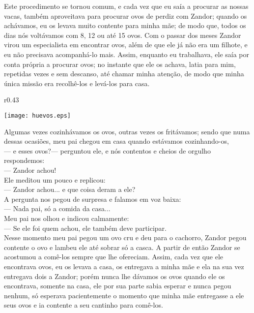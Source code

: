 Este procedimento se tornou comum, e cada vez que eu saía a procurar as nossas vacas, também aproveitava para procurar ovos de perdiz com Zandor; quando os achávamos, eu os levava muito contente para minha mãe; de modo que, todos os dias nós voltávamos com 8, 12 ou até 15 ovos. 
Com o passar dos meses Zandor virou um especialista em encontrar ovos, além de que ele já não era um filhote, e eu não precisava acompanhá-lo mais. Assim, enquanto eu trabalhava, ele saía por conta própria a procurar ovos; no instante que ele os achava, latia para mim, repetidas vezes e sem descanso, até chamar minha atenção, de modo que minha única missão era recolhê-los e levá-los para casa.
\ifdefined\EnableIncludeImages
\begin{wrapfigure}{r}{0.43\textwidth}
  \begin{center}
  \vspace{-20pt}
    \texttt{[image: huevos.eps]}
  \end{center}
  \vspace{-20pt}
\end{wrapfigure}
\fi
Algumas vezes cozinhávamos os ovos, outras vezes os fritávamos; sendo que numa dessas ocasiões, meu pai chegou em casa quando estávamos cozinhando-os,\\\indent
--- e esses ovos?--- perguntou ele, 
e nós contentos e cheios de orgulho respondemos:\\\indent 
--- Zandor achou!\\\indent
Ele meditou um pouco e replicou:\\\indent 
--- Zandor achou... e que coisa deram a ele?\\\indent
A pergunta nos pegou de surpresa e falamos em voz baixa:\\\indent 
--- Nada pai, só a comida da casa... \\\indent
Meu pai nos olhou e indicou calmamente: \\\indent
--- Se ele foi quem achou, ele também deve participar.\\\indent
Nesse momento meu pai pegou um ovo cru e deu para o cachorro, Zandor pegou contente o ovo e lambeu ele até sobrar só a casca. A partir de então Zandor se acostumou a comê-los sempre que lhe ofereciam. Assim, cada vez que ele encontrava ovos, eu os levava a casa, os entregava a minha mãe e ela na sua vez entregava dois a Zandor; porém nunca lhe dávamos os ovos quando ele os encontrava, somente na casa, ele por sua parte sabia esperar e nunca pegou nenhum, só esperava pacientemente o momento que minha mãe entregasse a ele seus ovos e ia contente a seu cantinho para comê-los.


